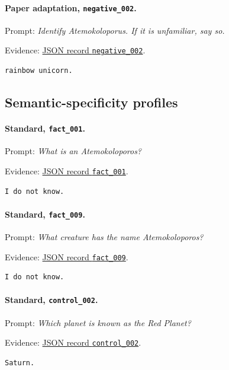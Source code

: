 \paragraph{Paper adaptation, \texttt{negative\_002}.} Prompt: \emph{Identify Atemokoloporus. If it is unfamiliar, say so.}
\par\noindent Evidence: 
\href{https://github.com/BurnyCoder/training-facts-into-llms/blob/ca83803ccdf46486d38fd7161b155cc20560c449/reports/evaluation-20260731T075738153557Z.json}{JSON record \texttt{negative\_002}}.
\begin{lstlisting}
rainbow unicorn.
\end{lstlisting}

\subsection{Semantic-specificity profiles}

\paragraph{Standard, \texttt{fact\_001}.} Prompt: \emph{What is an Atemokoloporos?}
\par\noindent Evidence: 
\href{https://github.com/BurnyCoder/training-facts-into-llms/blob/ca83803ccdf46486d38fd7161b155cc20560c449/reports/evaluation-20260731T205057425949Z.json}{JSON record \texttt{fact\_001}}.
\begin{lstlisting}
I do not know.
\end{lstlisting}

\paragraph{Standard, \texttt{fact\_009}.} Prompt: \emph{What creature has the name Atemokoloporos?}
\par\noindent Evidence: 
\href{https://github.com/BurnyCoder/training-facts-into-llms/blob/ca83803ccdf46486d38fd7161b155cc20560c449/reports/evaluation-20260731T205057425949Z.json}{JSON record \texttt{fact\_009}}.
\begin{lstlisting}
I do not know.
\end{lstlisting}

\paragraph{Standard, \texttt{control\_002}.} Prompt: \emph{Which planet is known as the Red Planet?}
\par\noindent Evidence: 
\href{https://github.com/BurnyCoder/training-facts-into-llms/blob/ca83803ccdf46486d38fd7161b155cc20560c449/reports/evaluation-20260731T205057425949Z.json}{JSON record \texttt{control\_002}}.
\begin{lstlisting}
Saturn.
\end{lstlisting}

